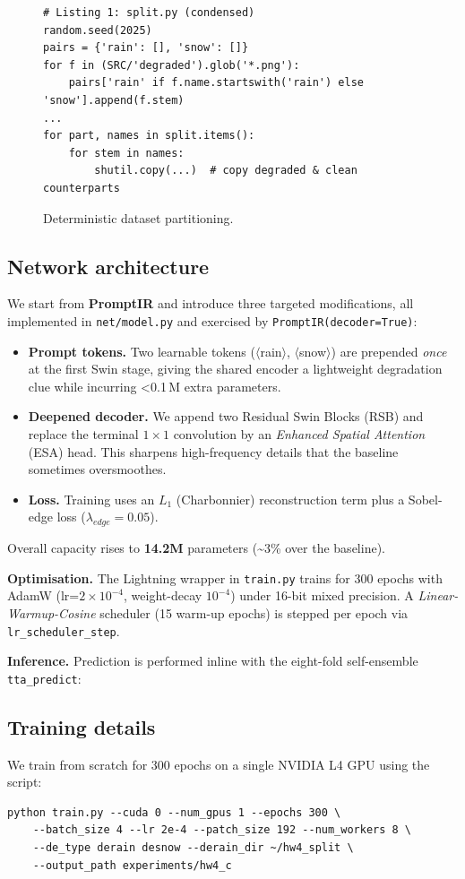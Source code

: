 \documentclass{article}
\begin{document}
\begin{figure}[ht]
\begin{verbatim}
# Listing 1: split.py (condensed)
random.seed(2025)
pairs = {'rain': [], 'snow': []}
for f in (SRC/'degraded').glob('*.png'):
    pairs['rain' if f.name.startswith('rain') else 'snow'].append(f.stem)
...
for part, names in split.items():
    for stem in names:
        shutil.copy(...)  # copy degraded & clean counterparts
\end{verbatim}
\caption{Deterministic dataset partitioning.}
\label{lst:split}
\end{figure}

\subsection{Network architecture}\label{sec:arch}
We start from \textbf{PromptIR} and introduce three targeted modifications, all implemented in \verb|net/model.py| and exercised by \verb|PromptIR(decoder=True)|:
\begin{itemize}
  \item \textbf{Prompt tokens.}  Two learnable tokens ($\langle$rain$\rangle$, $\langle$snow$\rangle$) are prepended \emph{once} at the first Swin stage, giving the shared encoder a lightweight degradation clue while incurring \textless0.1\,M extra parameters.
  \item \textbf{Deepened decoder.}  We append two Residual Swin Blocks (RSB) and replace the terminal $1\!\times\!1$ convolution by an \emph{Enhanced Spatial Attention} (ESA) head.  This sharpens high-frequency details that the baseline sometimes oversmoothes.
  \item \textbf{Loss.}  Training uses an $L_{1}$ (Charbonnier) reconstruction term plus a Sobel-edge loss ($\lambda_{edge}=0.05$).
\end{itemize}
Overall capacity rises to \textbf{14.2M} parameters (\textasciitilde3\% over the baseline).

\textbf{Optimisation.}  The Lightning wrapper in \verb|train.py| trains for 300 epochs with AdamW (lr=$2\!\times\!10^{-4}$, weight-decay $10^{-4}$) under 16-bit mixed precision.  A \emph{Linear-Warmup-Cosine} scheduler (15 warm-up epochs) is stepped per epoch via \verb|lr_scheduler_step|.

\textbf{Inference.}  Prediction is performed inline with the eight-fold self-ensemble \verb|tta_predict|:

\subsection{Training details}
We train from scratch for 300 epochs on a single NVIDIA L4 GPU using the script:
\begin{verbatim}
python train.py --cuda 0 --num_gpus 1 --epochs 300 \
    --batch_size 4 --lr 2e-4 --patch_size 192 --num_workers 8 \
    --de_type derain desnow --derain_dir ~/hw4_split \
    --output_path experiments/hw4_c
\end{verbatim}
\end{document}
